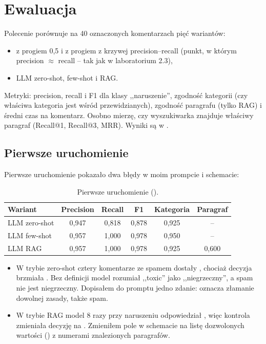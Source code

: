 \newpage
\section{Ewaluacja}
\label{sec:ewaluacja}

Polecenie  porównuje na 40 oznaczonych komentarzach pięć wariantów:
\begin{itemize}
  \item {} z progiem 0,5 i z progiem z krzywej precision--recall (punkt, w którym precision
        $\approx$ recall -- tak jak w laboratorium 2.3),
  \item LLM zero-shot, few-shot i RAG.
\end{itemize}
Metryki: precision, recall i F1 dla klasy ,,naruszenie'', zgodność kategorii (czy właściwa kategoria jest wśród
przewidzianych), zgodność paragrafu (tylko RAG) i średni czas na komentarz. Osobno mierzę, czy wyszukiwarka znajduje
właściwy paragraf (Recall@1, Recall@3, MRR). Wyniki są w .

\subsection{Pierwsze uruchomienie}

Pierwsze uruchomienie pokazało dwa błędy w moim prompcie i schemacie:

\begin{table}[H]
\centering
\small
\begin{tabular}{@{}lccccc@{}}
\toprule
Wariant & Precision & Recall & F1 & Kategoria & Paragraf \\
\midrule
LLM zero-shot & 0,947 & 0,818 & 0,878 & 0,925 & -- \\
LLM few-shot & 0,957 & 1,000 & 0,978 & 0,950 & -- \\
LLM RAG & 0,957 & 1,000 & 0,978 & 0,925 & 0,600 \\
\bottomrule
\end{tabular}
\caption{Pierwsze uruchomienie ().}
\end{table}

\begin{itemize}
  \item W trybie zero-shot cztery komentarze ze spamem dostały , chociaż decyzja brzmiała
        . Bez definicji model rozumiał ,,toxic'' jako ,,niegrzeczny'', a spam nie jest niegrzeczny.
        Dopisałem do promptu jedno zdanie:  oznacza złamanie dowolnej zasady, także spam.
  \item W trybie RAG model 8 razy przy naruszeniu odpowiedział , więc kontrola zmieniała decyzję na
        . Zmieniłem pole  w schemacie na listę dozwolonych wartości () z numerami
        znalezionych paragrafów.
\end{itemize}

